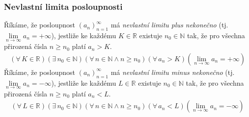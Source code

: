 \documentclass[12pt]{article}
\begin{document}
\subsubsection{Nevlastní limita posloupnosti}
\label{sec:posl_limita_nev}
Říkáme, že posloupnost $(a_n)_{n=1}^{\infty}$ má \emph{nevlastní limitu plus nekonečno} (tj. $\lim\limits_{n \to \infty} a_n = +\infty$), jestliže ke každému $K \in \mathbb{R}$ existuje $n_0 \in \mathbb{N}$ tak, že pro všechna přirozená čísla $n \geq n_0$ platí $a_n > K$.
\begin{align}
( \forall \, K \in \mathbb{R})( \exists \, n_0 \in \mathbb{N})( \forall \, n \in \mathbb{N}\land n \geq n_0)( \forall \, a_n >K) \left(\lim_{n \to \infty} a_n = + \infty\right)
\end{align}
Říkáme, že posloupnost $(a_n)_{n=1}^{\infty}$ má \emph{nevlastní limitu minus nekonečno} (tj. $\lim\limits_{n \to \infty} a_n = -\infty$), jestliže ke každému $L \in \mathbb{R}$ existuje $n_0 \in \mathbb{N}$ tak, že pro všechna přirozená čísla $n \geq n_0$ platí $a_n <L$.
\begin{align}
( \forall \, L \in \mathbb{R})( \exists \, n_0 \in \mathbb{N})(\forall \, n \in \mathbb{N} \land n \geq n_0)( \forall \, a_n <L) \left(\lim_{n \to \infty} a_n = - \infty\right)
\end{align}
\end{document}
